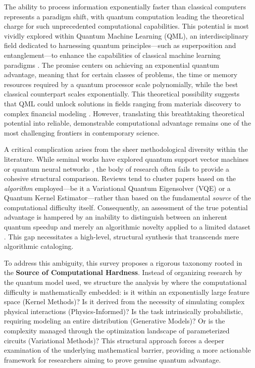 \documentclass{article}
\begin{document}
\label{sec:introduction}

The ability to process information exponentially faster than classical computers represents a paradigm shift, with quantum computation leading the theoretical charge for such unprecedented computational capabilities. This potential is most vividly explored within Quantum Machine Learning (QML), an interdisciplinary field dedicated to harnessing quantum principles---such as superposition and entanglement---to enhance the capabilities of classical machine learning paradigms \cite{zeguendry2023quantum}. The promise centers on achieving an exponential quantum advantage, meaning that for certain classes of problems, the time or memory resources required by a quantum processor scale polynomially, while the best classical counterpart scales exponentially. This theoretical possibility suggests that QML could unlock solutions in fields ranging from materials discovery to complex financial modeling \cite{egger2020quantum}. However, translating this breathtaking theoretical potential into reliable, demonstrable computational advantage remains one of the most challenging frontiers in contemporary science.

A critical complication arises from the sheer methodological diversity within the literature. While seminal works have explored quantum support vector machines \cite{cervantes2020comprehensive} or quantum neural networks \cite{chakraborty2020analytical}, the body of research often fails to provide a cohesive structural comparison. Reviews tend to cluster papers based on the \textit{algorithm} employed---be it a Variational Quantum Eigensolver (VQE) or a Quantum Kernel Estimator---rather than based on the fundamental \textit{source} of the computational difficulty itself. Consequently, an assessment of the true potential advantage is hampered by an inability to distinguish between an inherent quantum speedup and merely an algorithmic novelty applied to a limited dataset \cite{raubitzek2023applicability}. This gap necessitates a high-level, structural synthesis that transcends mere algorithmic cataloging.

To address this ambiguity, this survey proposes a rigorous taxonomy rooted in the \textbf{Source of Computational Hardness}. Instead of organizing research by the quantum model used, we structure the analysis by where the computational difficulty is mathematically embedded: is it within an exponentially large feature space (Kernel Methods)? Is it derived from the necessity of simulating complex physical interactions (Physics-Informed)? Is the task intrinsically probabilistic, requiring modeling an entire distribution (Generative Models)? Or is the complexity managed through the optimization landscape of parameterized circuits (Variational Methods)? This structural approach forces a deeper examination of the underlying mathematical barrier, providing a more actionable framework for researchers aiming to prove genuine quantum advantage.
\end{document}
